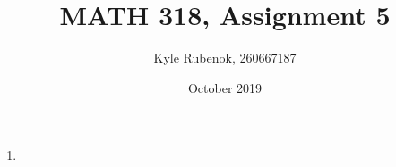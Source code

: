 \documentclass{article}
\title{MATH 318, Assignment 5}
\author{Kyle Rubenok, 260667187}
\date{October 2019}
\begin{document}
\maketitle

\begin{enumerate}
    \item
\end{enumerate}
\end{document}
